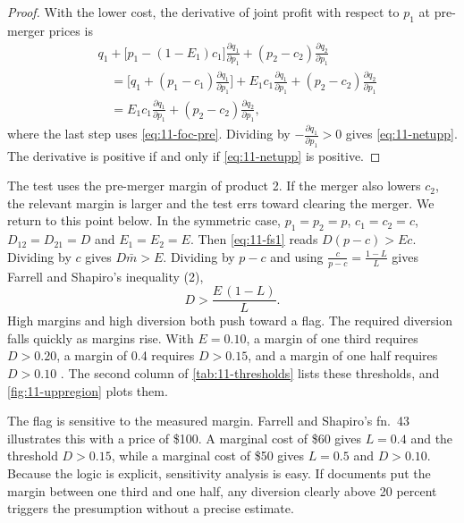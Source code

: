 \begin{proof}
With the lower cost, the derivative of joint profit with respect to $p_1$ at pre-merger prices is
\begin{align*}
  & q_1 + \big[p_1 - (1 - E_1)c_1\big]\frac{\partial q_1}{\partial p_1} + (p_2 - c_2)\frac{\partial q_2}{\partial p_1} \\
  &\quad = \Big[q_1 + (p_1 - c_1)\frac{\partial q_1}{\partial p_1}\Big] + E_1 c_1 \frac{\partial q_1}{\partial p_1}
           + (p_2 - c_2)\frac{\partial q_2}{\partial p_1} \\
  &\quad = E_1 c_1 \frac{\partial q_1}{\partial p_1} + (p_2 - c_2)\frac{\partial q_2}{\partial p_1} ,
\end{align*}
where the last step uses \eqref{eq:11-foc-pre}. Dividing by $-\frac{\partial q_1}{\partial p_1} > 0$ gives
\eqref{eq:11-netupp}. The derivative is positive if and only if \eqref{eq:11-netupp} is positive.
\end{proof}

The test uses the pre-merger margin of product 2. If the merger also lowers $c_2$, the relevant margin is larger and
the test errs toward clearing the merger. We return to this point below. In the symmetric case, $p_1 = p_2 = p$,
$c_1 = c_2 = c$, $D_{12} = D_{21} = D$ and $E_1 = E_2 = E$. Then \eqref{eq:11-fs1} reads $D(p - c) > Ec$. Dividing by
$c$ gives $D\bar m > E$. Dividing by $p - c$ and using $\frac{c}{p - c} = \frac{1 - L}{L}$ gives Farrell and Shapiro's
inequality (2),
\begin{equation}\label{eq:11-fs2}
  D > \frac{E\,(1 - L)}{L} .
\end{equation}
High margins and high diversion both push toward a flag. The required diversion falls quickly as margins rise. With
$E = 0.10$, a margin of one third requires $D > 0.20$, a margin of 0.4 requires $D > 0.15$, and a margin of one half
requires $D > 0.10$ \citep[fn.~43 and p.~17]{FarrellShapiro2010}. The second column of \cref{tab:11-thresholds} lists
these thresholds, and \cref{fig:11-uppregion} plots them.

The flag is sensitive to the measured margin. Farrell and Shapiro's fn.~43 illustrates this with a price of \$100. A
marginal cost of \$60 gives $L = 0.4$ and the threshold $D > 0.15$, while a marginal cost of \$50 gives $L = 0.5$ and
$D > 0.10$. Because the logic is explicit, sensitivity analysis is easy. If documents put the margin between one third
and one half, any diversion clearly above 20 percent triggers the presumption without a precise estimate.

